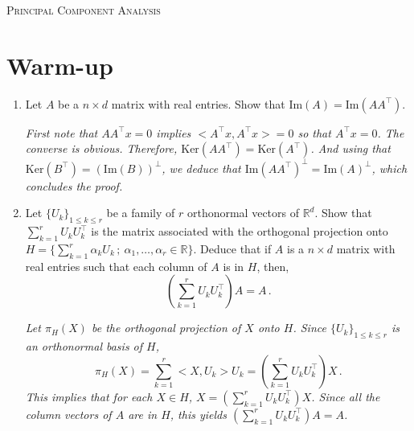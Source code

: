 \documentclass[a4paper,10pt,fleqn]{article}
\newcommand{\eqsp}{\,}
\newcommand{\rset}{\ensuremath{\mathbb{R}}}
\newcommand{\1}{\ensuremath{\mathbbm{1}}}
\newcommand{\bfA}{A}
\begin{document}

\noindent\hrulefill

\begin{center}
\textsc{Principal Component Analysis}
\end{center}
\hrulefill

\medskip


\section*{Warm-up}

\begin{enumerate}
\item Let $\bfA$ be a $n\times d$ matrix with real entries. Show that $\mathrm{Im}(\bfA)=\mathrm{Im}(\bfA \bfA^\top)$.

\vspace{.2cm}

{\em
    First note that $\bfA\bfA^\top x=0$ implies $<\bfA^\top x,\bfA^\top x>=0$ so that $\bfA^\top x=0$. The converse is obvious. Therefore, $\mathrm{Ker}(\bfA \bfA^\top)= \mathrm{Ker}(\bfA^\top)$. And using that $\mathrm{Ker}(B^\top)=(\mathrm{Im}(B))^\perp$, we deduce that $\mathrm{Im}(\bfA \bfA^\top)^\perp=\mathrm{Im}(\bfA)^\perp$, which concludes the proof.
}
    
\item Let $\{U_k\}_{1\leq k \leq r}$ be a family of $r$ orthonormal vectors of $\rset^d$.
Show that $\sum_{k=1}^{r} U_k U_k^\top$ is the matrix associated with the orthogonal projection onto $H=\{\sum_{k=1}^r \alpha_k U_k\,; \ \alpha_1,\ldots,\alpha_r \in \rset\}$. Deduce that if $\bfA$ is a $n\times d$ matrix with real entries such that each column of $\bfA$ is in $H$, then,
$$
\left(\sum_{k=1}^r U_k U_k^\top\right) \bfA=\bfA\eqsp.
$$

\vspace{.2cm}

{\em
Let $\pi_H(X)$ be the orthogonal projection of $X$ onto $H$. Since $\{U_k\}_{1\leq k \leq r}$  is an orthonormal basis of $H$,
$$
\pi_H(X)=\sum_{k=1}^{r} <X,U_k>U_k=\left(\sum_{k=1}^{r} U_k U_k^\top\right)X\eqsp.
$$
This implies that for each $X \in H$, $X=\left(\sum_{k=1}^{r} U_k U_k^\top\right)X$. Since all the column vectors of $A$ are in $H$, this yields $\left(\sum_{k=1}^r U_k U_k^\top\right) \bfA=\bfA$.
}
\end{enumerate}
\end{document}
